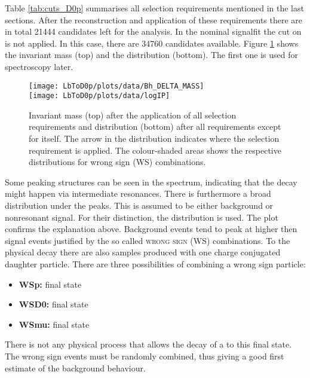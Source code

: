 Table \ref{tab:cuts_D0p} summarises all selection requirements mentioned in the last sections.
After the reconstruction and application of these requirements there are in total 21444 \LbToDpmunuX candidates left for the analysis.
In the nominal signalfit the cut on \logIP is not applied.
In this case, there are 34760 candidates available.
Figure \ref{fig:plot_mD0p_logIP} shows the invariant \Dz\proton mass (top) and the \logIP distribution (bottom). 
The first one is used for spectroscopy later.
\begin{figure}[hptb]
	\centering
	\texttt{[image: LbToD0p/plots/data/Bh\_DELTA\_MASS]} \\
	\texttt{[image: LbToD0p/plots/data/logIP]}
	\caption{Invariant \Dz\proton mass (top) after the application of all selection requirements and \logIP distribution (bottom) after all requirements except for \logIP itself.
             The arrow in the \logIP distribution indicates where the selection requirement is applied.
             The colour-shaded areas shows the respective distributions for wrong sign (WS) combinations.}
	\label{fig:plot_mD0p_logIP}
\end{figure}
Some peaking structures can be seen in the spectrum, indicating that the decay \LbToDpmunuX might happen via intermediate resonances.
There is furthermore a broad distribution under the peaks.
This is assumed to be either background or nonresonant signal.
For their distinction, the \logIP distribution is used.
The plot confirms the explanation above.
Background events tend to peak at higher \logIP then signal events justified by the so called \textsc{wrong sign (WS)} combinations.
To the physical decay \LbToDpmunuX there are also samples produced with one charge conjugated daughter particle.
There are three possibilities of combining a wrong sign particle:
\begin{itemize}
    \item \textbf{WSp:} \Dz\antiproton\mun final state
    \item \textbf{WSD0:} \Dzb\proton\mun final state
    \item \textbf{WSmu:} \Dz\proton\mup final state
\end{itemize}
There is not any physical process that allows the decay of a \Lb to this final state.
The wrong sign events must be randomly combined, thus giving a good first estimate of the \LbToDpmunuX background behaviour.

